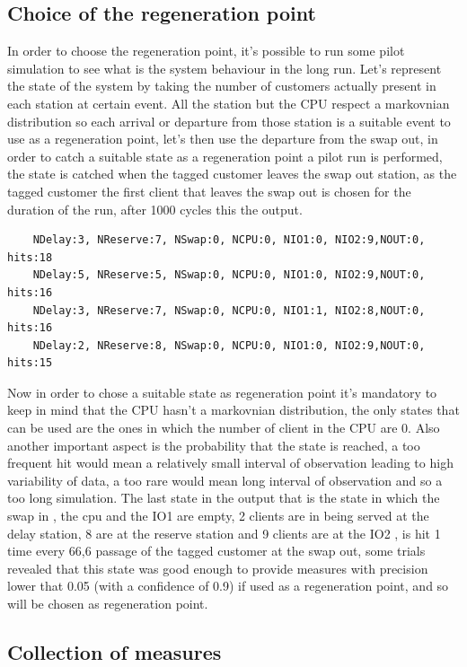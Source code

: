 \documentclass[12pt,a4paper]{article}
\begin{document}
\subsection{Choice of the regeneration point}
In order to choose the regeneration point, it's possible to run some pilot simulation to see what is the system behaviour in the long run. Let's represent the state of the system by taking the number of customers actually present in each station at certain event. All the station but the CPU respect a markovnian distribution so each arrival or departure from those station is a suitable event to use as a regeneration point, let's then use the departure from the swap out, in order to catch a suitable state as a regeneration point a pilot run is performed, the state is catched when the tagged customer leaves the swap out station, as the tagged customer the first client that leaves the swap out is chosen for the duration of the run, after 1000 cycles this the output.
\begin{verbatim}
    NDelay:3, NReserve:7, NSwap:0, NCPU:0, NIO1:0, NIO2:9,NOUT:0, hits:18
    NDelay:5, NReserve:5, NSwap:0, NCPU:0, NIO1:0, NIO2:9,NOUT:0, hits:16
    NDelay:3, NReserve:7, NSwap:0, NCPU:0, NIO1:1, NIO2:8,NOUT:0, hits:16
    NDelay:2, NReserve:8, NSwap:0, NCPU:0, NIO1:0, NIO2:9,NOUT:0, hits:15
\end{verbatim}
Now in order to chose a suitable state as regeneration point it's mandatory to keep in mind that the CPU hasn't a markovnian distribution, the only states that can be used are the ones in which the number of client in the CPU are 0. Also another important aspect is the probability that the state is reached, a too frequent hit would mean a relatively small interval of observation leading to high variability of data, a too rare would mean long interval of observation and so a too long simulation. The last state in the output that is the state in which  the swap in , the cpu and the IO1 are empty, 2 clients are in being served at the delay station, 8 are at the reserve station  and 9 clients are at the IO2 , is hit 1 time every 66,6 passage of the tagged customer at the swap out, some trials revealed that this state was good enough to provide measures with precision lower that 0.05 (with a confidence of 0.9) if used as a regeneration point, and so will be chosen as regeneration point.

\subsection{Collection of measures}
\end{document}
